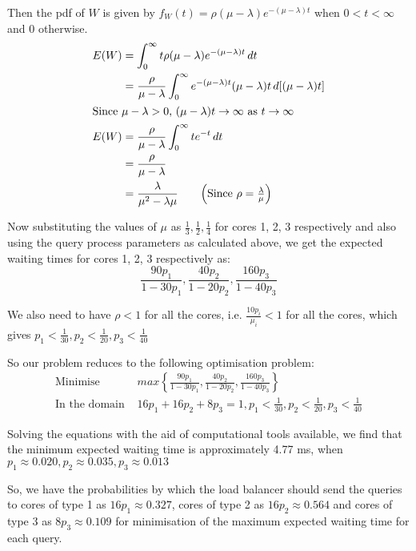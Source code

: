 \documentclass[12pt, oneside]{article}
\begin{document}
\begin{enumerate}
{    Then the pdf of \(W\) is given by \(f_W(t) = \rho(\mu - \lambda)e^{-(\mu - \lambda)t}\) when
    \(0 < t < \infty\) and 0 otherwise.
    \begin{align*}
        E(W) &= \int_0^\infty t \rho(\mu - \lambda)e^{-(\mu - \lambda)t} \,dt \\
             &= \frac{\rho}{\mu - \lambda} \int_0^\infty e^{-(\mu - \lambda)t} (\mu - \lambda) t \,d[(\mu - \lambda)t] \\
        \intertext{Since \(\mu - \lambda > 0\), \((\mu - \lambda)t \to \infty\) as \(t \to \infty\)}
        E(W) &= \frac{\rho}{\mu - \lambda} \int_0^\infty te^{-t}\,dt \\
             &= \frac{\rho}{\mu - \lambda} \\
             &= \frac{\lambda}{\mu^2 - \lambda\mu} \tag*{\(\left(\text{Since } \rho = \frac{\lambda}{\mu}\right)\)}
    \end{align*}

    Now substituting the values of \(\mu\) as \(\frac{1}{3}, \frac{1}{2}, \frac{1}{4}\) for
    cores 1, 2, 3 respectively and also using the query process parameters as calculated above,
    we get the expected waiting times for cores 1, 2, 3 respectively as:
    \[
        \frac{90p_1}{1 - 30p_1}, \frac{40p_2}{1 - 20p_2}, \frac{160p_3}{1 - 40p_3}
    \]
    
    We also need to have \(\rho < 1\) for all the cores, i.e. \(\frac{10p_i}{\mu_i} < 1\) 
    for all the cores, which gives \(p_1 < \frac{1}{30}, p_2 < \frac{1}{20}, p_3 < \frac{1}{40}\)

    So our problem reduces to the following optimisation problem:
    \begin{align*}
        \text{Minimise } &max\left\{\frac{90p_1}{1 - 30p_1}, \frac{40p_2}{1 - 20p_2}, \frac{160p_3}{1 - 40p_3}\right\} \\
        \text{In the domain } &16p_1 + 16p_2 + 8p_3 = 1, p_1 < \frac{1}{30}, p_2 < \frac{1}{20}, p_3 < \frac{1}{40}
    \end{align*}

    Solving the equations with the aid of computational tools available, we find that the minimum expected waiting time
    is approximately 4.77 ms, when \(p_1 \approx 0.020, p_2 \approx 0.035, p_3 \approx 0.013\)

    So, we have the probabilities by which the load balancer should send the queries to
    cores of type 1 as \(16p_1 \approx 0.327\), cores of type 2 as \(16p_2 \approx 0.564\)
    and cores of type 3 as \(8p_3 \approx 0.109\) for minimisation of the maximum expected
    waiting time for each query.
}


\end{enumerate}
\end{document}
